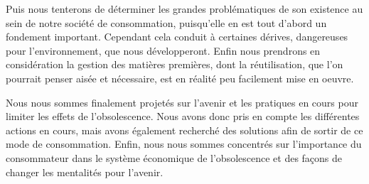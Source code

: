 \medbreak Puis nous tenterons de déterminer les grandes problématiques de son existence au sein de notre société de consommation, puisqu'elle en est tout d'abord un fondement important. Cependant cela conduit à certaines dérives, dangereuses pour l'environnement, que nous développeront. Enfin nous prendrons en considération la gestion des matières premières, dont la réutilisation, que l'on pourrait penser aisée et nécessaire, est en réalité peu facilement mise en oeuvre.

\medbreak Nous nous sommes finalement projetés sur l'avenir et les pratiques en cours pour limiter les effets de l'obsolescence. Nous avons donc pris en compte les différentes actions en cours, mais avons également recherché des solutions afin de sortir de ce mode de consommation. Enfin, nous nous sommes concentrés sur l'importance du consommateur dans le système économique de l'obsolescence et des façons de changer les mentalités pour l'avenir.

